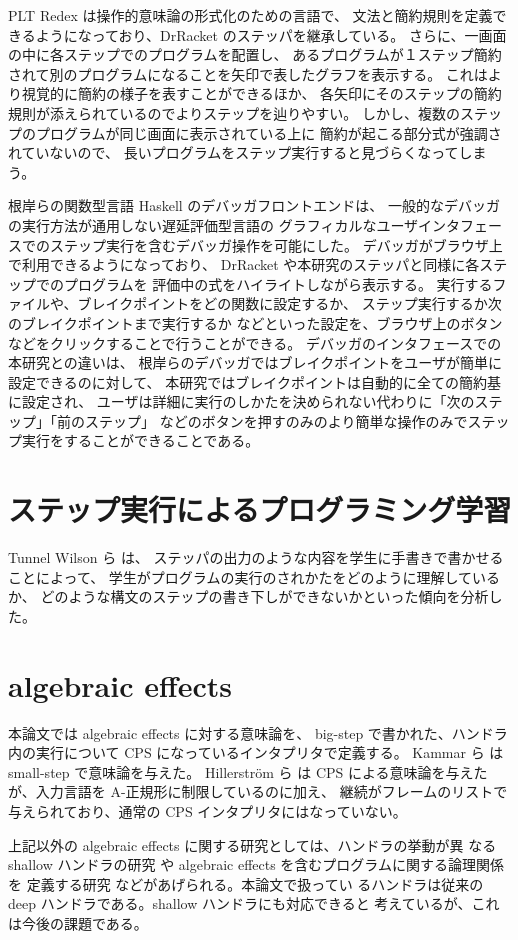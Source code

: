 PLT Redex \cite{felleisen09}は操作的意味論の形式化のための言語で、
文法と簡約規則を定義できるようになっており、DrRacket のステッパを継承している。
さらに、一画面の中に各ステップでのプログラムを配置し、
あるプログラムが１ステップ簡約されて別のプログラムになることを矢印で表したグラフを表示する。
これはより視覚的に簡約の様子を表すことができるほか、
各矢印にそのステップの簡約規則が添えられているのでよりステップを辿りやすい。
しかし、複数のステップのプログラムが同じ画面に表示されている上に
簡約が起こる部分式が強調されていないので、
長いプログラムをステップ実行すると見づらくなってしまう。

根岸ら\cite{NI2009}の関数型言語 Haskell のデバッガフロントエンドは、
一般的なデバッガの実行方法が通用しない遅延評価型言語の
グラフィカルなユーザインタフェースでのステップ実行を含むデバッガ操作を可能にした。
デバッガがブラウザ上で利用できるようになっており、
DrRacket や本研究のステッパと同様に各ステップでのプログラムを
評価中の式をハイライトしながら表示する。
実行するファイルや、ブレイクポイントをどの関数に設定するか、
ステップ実行するか次のブレイクポイントまで実行するか
などといった設定を、ブラウザ上のボタンなどをクリックすることで行うことができる。
デバッガのインタフェースでの本研究との違いは、
根岸ら\cite{NI2009}のデバッガではブレイクポイントをユーザが簡単に設定できるのに対して、
本研究ではブレイクポイントは自動的に全ての簡約基に設定され、
ユーザは詳細に実行のしかたを決められない代わりに「次のステップ」「前のステップ」
などのボタンを押すのみのより簡単な操作のみでステップ実行をすることができることである。

\section{ステップ実行によるプログラミング学習}

Tunnel Wilson ら \cite{tunnell18} は、
ステッパの出力のような内容を学生に手書きで書かせることによって、
学生がプログラムの実行のされかたをどのように理解しているか、
どのような構文のステップの書き下しができないかといった傾向を分析した。

\section{algebraic effects}
\label{section:algebraic effects__related}

本論文では algebraic effects に対する意味論を、
big-step で書かれた、ハンドラ内の実行について CPS になっているインタプリタで定義する。
Kammar ら \cite{10.1145/2500365.2500590} は small-step で意味論を与えた。
Hillerstr{\"o}m ら \cite{e6cb0c3222794e48bf38cf44e46fe4aa} は
CPS による意味論を与えたが、入力言語を A-正規形に制限しているのに加え、
継続がフレームのリストで与えられており、通常の CPS インタプリタにはなっていない。

上記以外の algebraic effects に関する研究としては、ハンドラの挙動が異
なる shallow ハンドラの研究 \cite{10.1007/978-3-030-02768-1_22} や
algebraic effects を含むプログラムに関する論理関係を
定義する研究 \cite{10.1145/3158096} などがあげられる。本論文で扱ってい
るハンドラは従来の deep ハンドラである。shallow ハンドラにも対応できると
考えているが、これは今後の課題である。

